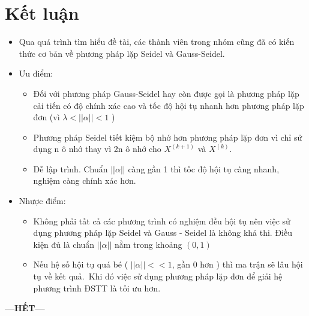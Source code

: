 \documentclass[12pt,a4paper]{article}
\begin{document}
\section{Kết luận}
{\renewcommand{\labelitemi}{$\blacksquare$}
\renewcommand\labelitemii{$\nabla$}
\renewcommand\labelitemiii{$\square$}

\begin{itemize}

\item Qua quá trình tìm hiểu đề tài, các thành viên trong nhóm cũng đã có kiến thức cơ bản về phương pháp lặp Seidel và Gauss-Seidel. 

\end{itemize}

\begin{itemize}

\item Ưu điểm: 
\begin{itemize}
\item Đối với phương pháp Gauss-Seidel hay còn được gọi là phương pháp lặp cải tiến có {\color{red}độ chính xác cao} và {\color{red}tốc độ hội tụ nhanh hơn} phương pháp lặp đơn (vì $\lambda < ||\alpha|| < 1$ )\\

\item Phương pháp Seidel {\color{red}tiết kiệm bộ nhớ hơn} phương pháp lặp đơn vì chỉ sử dụng n ô nhớ thay vì 2n ô nhớ cho $X^{(k + 1)}$ và $X^{(k)}$.\\

\item {\color{red}Dễ lập trình}. Chuẩn  $ || \alpha || $ càng gần 1 thì tốc độ hội tụ càng nhanh, nghiệm càng chính xác hơn.\\
\end{itemize}
\item Nhược điểm:
\begin{itemize}
\item Không phải tất cả các phương trình có nghiệm đều hội tụ nên việc sử dụng phương pháp lặp Seidel và Gauss - Seidel là không khả thi. Điều kiện đủ là chuẩn $ || \alpha || $ nằm trong khoảng $(0, 1)$\\

\item Nếu hệ số hội tụ quá bé ( $ || \alpha || << 1 $, gần 0 hơn ) thì ma trận sẽ lâu hội tụ về kết quả.\ Khi đó việc sử dụng phương pháp lặp đơn để giải hệ phương trình ĐSTT là tối ưu hơn.
\end{itemize}
\end{itemize}

}
\begin{center}
\bfseries 
{---HẾT---}
\end{center}
\newpage
\end{document}
